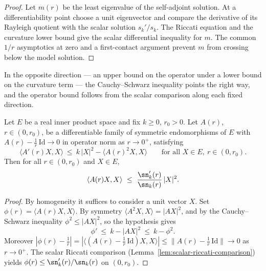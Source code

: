 \begin{proof}
\sketch
\leanok
Let $m(r)$ be the least eigenvalue of the self-adjoint solution. At a differentiability point choose a unit eigenvector and compare the derivative of its Rayleigh quotient with the scalar solution $s_k'/s_k$. The Riccati equation and the curvature lower bound give the scalar differential inequality for $m$. The common $1/r$ asymptotics at zero and a first-contact argument prevent $m$ from crossing below the model solution.
\end{proof}

In the opposite direction — an upper bound on the operator under a
lower bound on the curvature term — the Cauchy--Schwarz inequality
points the right way, and the operator bound follows from the scalar
comparison along each fixed direction.

\begin{lemma}
\label{lem:operator-riccati-upper}
\leanok



Let $E$ be a real inner product space and fix $k\ge0$, $r_0>0$. Let
$A(r)$, $r\in(0,r_0)$, be a differentiable family of symmetric
endomorphisms of $E$ with
$A(r)-\tfrac1r\,\mathrm{Id}\to0$ in operator norm as $r\to0^+$,
satisfying
$$\langle A'(r)X,X\rangle\ \le\ k\,|X|^2-\langle A(r)^2X,X\rangle
\qquad\text{for all }X\in E,\ r\in(0,r_0).$$
Then for all $r\in(0,r_0)$ and $X\in E$,
$$\langle A(r)X,X\rangle\ \le\
\frac{\sn_k'(r)}{\sn_k(r)}\,|X|^2 .$$
\end{lemma}

\begin{proof}
\sketch
{}
\leanok
By homogeneity it suffices to consider a unit vector $X$. Set
$\phi(r)=\langle A(r)X,X\rangle$. By symmetry
$\langle A^2X,X\rangle=|AX|^2$, and by the Cauchy--Schwarz
inequality $\phi^2\le|AX|^2$, so the hypothesis gives
$$\phi'\ \le\ k-|AX|^2\ \le\ k-\phi^2 .$$
Moreover
$|\phi(r)-\tfrac1r|=|\langle(A(r)-\tfrac1r\,\mathrm{Id})X,X\rangle|
\le\|A(r)-\tfrac1r\,\mathrm{Id}\|\to0$ as $r\to0^+$. The scalar
Riccati comparison (Lemma~\ref{lem:scalar-riccati-comparison})
yields $\phi(r)\le\sn_k'(r)/\sn_k(r)$ on $(0,r_0)$.
\end{proof}

